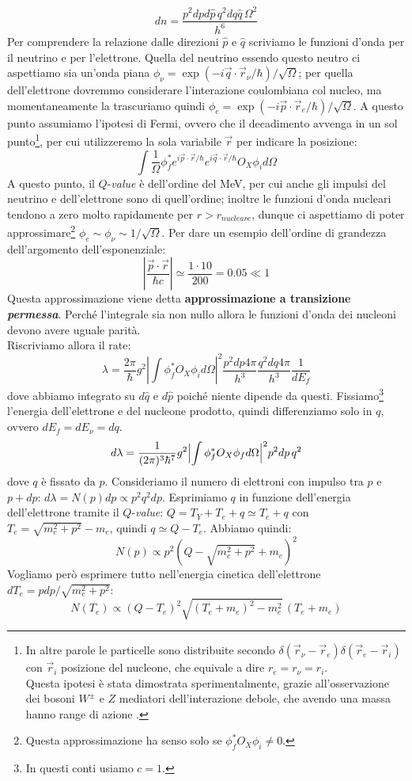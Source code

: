 $$dn = \frac{p^2 dp d\hat{p}\,q^2dq\hat{q}\,\Omega^2}{h^6}$$
Per comprendere la relazione dalle direzioni $\hat{p}$ e $\hat{q}$ scriviamo le funzioni d'onda per il neutrino e per l'elettrone. Quella del neutrino essendo questo neutro ci aspettiamo sia un'onda piana $\phi_\nu = \exp{(-i\vec{q}\cdot\vec{r}_\nu/\hbar)}/\sqrt{\Omega}$; per quella dell'elettrone dovremmo considerare l'interazione coulombiana col nucleo, ma momentaneamente la trascuriamo quindi $\phi_e = \exp{(-i\vec{p}\cdot\vec{r}_e/\hbar)}/\sqrt{\Omega}$. A questo punto assumiamo l'ipotesi di Fermi, ovvero che il decadimento avvenga in un sol punto\footnote{In altre parole le particelle sono distribuite secondo $\delta(\vec{r}_\nu - \vec{r}_e)\delta(\vec{r}_e-\vec{r}_i)$ con $\vec{r}_i$ posizione del nucleone, che equivale a dire $r_e=r_\nu=r_i$.\\ 
Questa ipotesi è stata dimostrata sperimentalmente, grazie all'osservazione dei bosoni $W^\pm$ e $Z$ mediatori dell'interazione debole, che avendo una massa  hanno range di azione .}, per cui utilizzeremo la sola variabile $\vec{r}$ per indicare la posizione: 
$$\int \frac{1}{\Omega} \phi^*_f e^{i\vec{p}\cdot\vec{r}/\hbar} e^{i\vec{q}\cdot\vec{r}/\hbar} O_X \phi_i d\Omega$$
A questo punto, il $Q$-\textit{value} è dell'ordine del MeV, per cui anche gli impulsi del neutrino e dell'elettrone sono di quell'ordine; inoltre le funzioni d'onda nucleari tendono a zero molto rapidamente per $r>r_{nucleare}$, dunque ci aspettiamo di poter approssimare\footnote{Questa approssimazione ha senso solo se $\phi^*_f O_X \phi_i \not = 0$.} $\phi_e\sim\phi_\nu\sim 1/\sqrt{\Omega}$. Per dare un esempio dell'ordine di grandezza dell'argomento dell'esponenziale:
$$|\frac{\vec{p}\cdot\vec{r}}{\hbar c}|\simeq \frac{1\cdot10}{200}=0.05\ll 1$$
Questa approssimazione viene detta \textbf{approssimazione a transizione \textit{permessa}}. Perché l'integrale sia non nullo allora le funzioni d'onda dei nucleoni devono avere uguale parità.\\
Riscriviamo allora il rate:
$$\lambda = \frac{2\pi}{\hbar}g^2 |\int \phi^*_f O_X \phi_i d\Omega|^2 \frac{p^2 dp 4\pi}{h^3}\frac{q^2dq4\pi}{h^3}\frac{1}{dE_f}$$
dove abbiamo integrato su $d\hat{q}$ e $d\hat{p}$ poiché niente dipende da questi. Fissiamo\footnote{In questi conti usiamo $c=1$.} l'energia dell'elettrone e del nucleone prodotto, quindi differenziamo solo in $q$, ovvero $dE_f = dE_\nu = dq$.
$$d\lambda = \frac{1}{(2\pi)^3 \hbar^7}g^2 \Bigl |\int \phi_f^* O_X \phi_f d\Omega\Bigr |^2 p^2 dp\, q^2 $$
dove $q$ è fissato da $p$. Consideriamo il numero di elettroni con impulso tra $p$ e $p+dp$: $d\lambda = N(p)dp \propto p^2 q^2 dp$. Esprimiamo $q$ in funzione dell'energia dell'elettrone tramite il $Q$-\textit{value}: $Q = T_Y + T_e + q \simeq T_e + q$ con $T_e = \sqrt{m_e^2 + p^2}-m_e$, quindi $q \simeq Q-T_e$. Abbiamo quindi:
$$N(p) \propto p^2(Q-\sqrt{m_e^2 + p^2}+m_e)^2$$
Vogliamo però esprimere tutto nell'energia cinetica dell'elettrone $dT_e = pdp/\sqrt{m_e^2+p^2}$:
$$N(T_e) \propto (Q-T_e)^2 \sqrt{(T_e+m_e)^2-m_e^2}\,(T_e + m_e) $$

